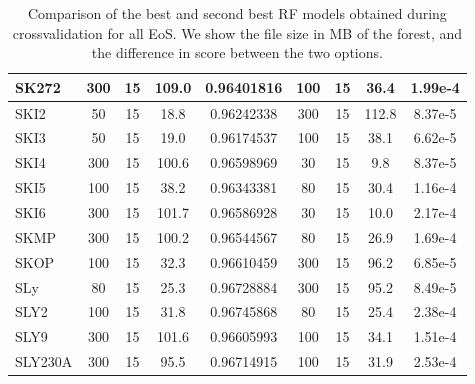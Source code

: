 \begin{table*}[h]
\begin{tabular}{@{}lcccccccc@{}}
\multicolumn{1}{|l|}{SK272}     & 300   & 15    & 109.0 & \multicolumn{1}{c|}{0.96401816} & 100   & 15    & 36.4  & \multicolumn{1}{c|}{1.99e-4}       \\ \midrule
\multicolumn{1}{|l|}{SKI2}      & 50    & 15    & 18.8  & \multicolumn{1}{c|}{0.96242338} & 300   & 15    & 112.8 & \multicolumn{1}{c|}{8.37e-5}       \\ \midrule
\multicolumn{1}{|l|}{SKI3}      & 50    & 15    & 19.0  & \multicolumn{1}{c|}{0.96174537} & 100   & 15    & 38.1  & \multicolumn{1}{c|}{6.62e-5}       \\ \midrule
\multicolumn{1}{|l|}{SKI4}      & 300   & 15    & 100.6 & \multicolumn{1}{c|}{0.96598969} & 30    & 15    & 9.8   & \multicolumn{1}{c|}{8.37e-5}       \\ \midrule
\multicolumn{1}{|l|}{SKI5}      & 100   & 15    & 38.2  & \multicolumn{1}{c|}{0.96343381} & 80    & 15    & 30.4  & \multicolumn{1}{c|}{1.16e-4}       \\ \midrule
\multicolumn{1}{|l|}{SKI6}      & 300   & 15    & 101.7 & \multicolumn{1}{c|}{0.96586928} & 30    & 15    & 10.0  & \multicolumn{1}{c|}{2.17e-4}       \\ \midrule
\multicolumn{1}{|l|}{SKMP}      & 300   & 15    & 100.2 & \multicolumn{1}{c|}{0.96544567} & 80    & 15    & 26.9  & \multicolumn{1}{c|}{1.69e-4}       \\ \midrule
\multicolumn{1}{|l|}{SKOP}      & 100   & 15    & 32.3  & \multicolumn{1}{c|}{0.96610459} & 300   & 15    & 96.2  & \multicolumn{1}{c|}{6.85e-5}       \\ \midrule
\multicolumn{1}{|l|}{SLy}       & 80    & 15    & 25.3  & \multicolumn{1}{c|}{0.96728884} & 300   & 15    & 95.2  & \multicolumn{1}{c|}{8.49e-5}       \\ \midrule
\multicolumn{1}{|l|}{SLY2}      & 100   & 15    & 31.8  & \multicolumn{1}{c|}{0.96745868} & 80    & 15    & 25.4  & \multicolumn{1}{c|}{2.38e-4}       \\ \midrule
\multicolumn{1}{|l|}{SLY9}      & 300   & 15    & 101.6 & \multicolumn{1}{c|}{0.96605993} & 100   & 15    & 34.1  & \multicolumn{1}{c|}{1.51e-4}       \\ \midrule
SLY230A                         & 300   & 15    & 95.5  & 0.96714915                      & 100   & 15    & 31.9  & 2.53e-4                            \\ \bottomrule
\end{tabular}
\caption{Comparison of the best and second best RF models obtained during crossvalidation for all EoS. We show the file size in MB of the forest, and the difference in score between the two options.}
\label{tab:RFcross}
\end{table*}

